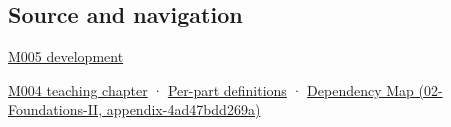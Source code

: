 \subsection{Source and navigation}\label{appendix-8f6a01f284a7-source-and-navigation}

\hyperref[01-foundations-i-ch001-when-arithmetic-meets-uncertainty]{M005 development}

\hyperref[01-foundations-i-ch001-a-stretching-ruler-for-real-valued-quantities]{M004 teaching chapter} · \hyperref[appendix-fd090d982a15-m004---parts-61-76]{Per-part definitions} · \href{../02-Foundations-II/main.pdf\#nameddest=appendix-4ad47bdd269a}{Dependency Map (02-Foundations-II, appendix-4ad47bdd269a)}
